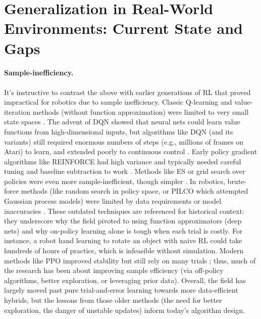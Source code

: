 
\section[Generalization in Real-World Environments]{Generalization in Real-World Environments: Current State and Gaps}

\paragraph{Sample-inefficiency.}

It's instructive to contrast the above with earlier generations of \ac{RL} that proved impractical for robotics due to sample inefficiency. Classic Q-learning and value-iteration methods (without function approximation) were limited to very small state spaces \cite{QLERN1992}. The advent of \ac{DQN} showed that neural nets could learn value functions from high-dimensional inputs, but algorithms like \ac{DQN} (and its variants) still required enormous numbers of steps (e.g., millions of frames on Atari) to learn, and extended poorly to continuous control \cite{DQN2013}. Early policy gradient algorithms like REINFORCE had high variance and typically needed careful tuning and baseline subtraction to work \cite{REINFORCE1992}. Methods like \ac{ES} or grid search over policies were even more sample-inefficient, though simpler \cite{ES2017}. In robotics, brute-force methods (like random search in policy space, or PILCO which attempted Gaussian process models) were limited by data requirements or model inaccuracies \cite{PILCO2011}. These outdated techniques are referenced for historical context: they underscore why the field pivoted to using function approximators (deep nets) and why on-policy learning alone is tough when each trial is costly. For instance, a robot hand learning to rotate an object with naive \ac{RL} could take hundreds of hours of practice, which is infeasible without simulation. Modern methods like \ac{PPO} improved stability but still rely on many trials \cite{PPO2017}; thus, much of the research has been about improving sample efficiency (via off-policy algorithms, better exploration, or leveraging prior data). Overall, the field has largely moved past pure trial-and-error learning towards more data-efficient hybrids, but the lessons from those older methods (the need for better exploration, the danger of unstable updates) inform today's algorithm design.
